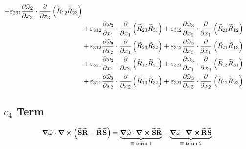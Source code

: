 \begin{equation}
{\begin{split}
                    +\varepsilon_{231}\pdv{\tilde{\omega}_{2}}{x_{3}}\cdot\pdv{}{x_{3}}\left(\widetilde{R}_{12}\widetilde{R}_{23}\right)    \\
                &   +\varepsilon_{312}\pdv{\tilde{\omega}_{3}}{x_{1}}\cdot\pdv{}{x_{1}}\left(\widetilde{R}_{23}\widetilde{R}_{31}\right)    
                    +\varepsilon_{312}\pdv{\tilde{\omega}_{3}}{x_{2}}\cdot\pdv{}{x_{1}}\left(\widetilde{R}_{21}\widetilde{R}_{12}\right)    \\
                &   +\varepsilon_{312}\pdv{\tilde{\omega}_{3}}{x_{2}}\cdot\pdv{}{x_{1}}\left(\widetilde{R}_{23}\widetilde{R}_{32}\right)    
                    +\varepsilon_{312}\pdv{\tilde{\omega}_{3}}{x_{3}}\cdot\pdv{}{x_{1}}\left(\widetilde{R}_{21}\widetilde{R}_{13}\right)    \\
                &   +\varepsilon_{321}\pdv{\tilde{\omega}_{3}}{x_{1}}\cdot\pdv{}{x_{2}}\left(\widetilde{R}_{12}\widetilde{R}_{21}\right)    
                    +\varepsilon_{321}\pdv{\tilde{\omega}_{3}}{x_{1}}\cdot\pdv{}{x_{2}}\left(\widetilde{R}_{13}\widetilde{R}_{31}\right)    \\
                &   +\varepsilon_{321}\pdv{\tilde{\omega}_{3}}{x_{2}}\cdot\pdv{}{x_{2}}\left(\widetilde{R}_{13}\widetilde{R}_{32}\right)    
                    +\varepsilon_{321}\pdv{\tilde{\omega}_{3}}{x_{3}}\cdot\pdv{}{x_{2}}\left(\widetilde{R}_{12}\widetilde{R}_{23}\right)    
        \end{split}
        }
\end{equation}
\newpage
\subsection{$c_{4}$ Term}
\begin{equation}
    \grad \widetilde{\mathbf{\omega}} \cdot \curl \left(\widetilde{\mathbf{S}} \widetilde{\mathbf{R}} - \widetilde{\mathbf{R}} \widetilde{\mathbf{S}} \right) = 
        \underbrace{\grad \widetilde{\mathbf{\omega}} \cdot \curl \widetilde{\mathbf{S}} \widetilde{\mathbf{R}}}_{\equiv \text{ term 1}}
        -\underbrace{\grad \widetilde{\mathbf{\omega}} \cdot \curl \widetilde{\mathbf{R}} \widetilde{\mathbf{S}}}_{\equiv \text{ term 2}}
\end{equation}
